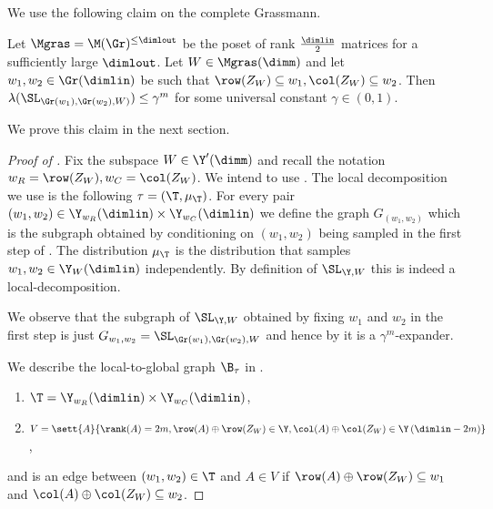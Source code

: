We use the following claim on the complete Grassmann.
\begin{claim} \label{claim:expansion-no-maximal-matrix-graph}
    Let \(\Mgras=\M(\Gr)^{\leq \dimlout}\) be the poset of rank \(\frac{\dimlin}{2}\) matrices for a sufficiently large \(\dimlout\). Let \(W \in \Mgras(\dimm)\) and let \(w_1,w_2 \in \Gr(\dimlin)\) be such that \(\row(Z_W) \subseteq w_1, \col(Z_W) \subseteq w_2\). Then \(\lambda(\SL_{\Gr(w_1),\Gr(w_2),W)}) \leq \gamma^{m}\) for some universal constant \(\gamma \in (0,1)\). 
\end{claim}
We prove this claim in the next section.

\begin{proof}[Proof of ]
    Fix the subspace \(W \in \Y'(\dimm)\) and recall the notation \(w_R = \row(Z_W), w_C = \col(Z_W)\). We intend to use . The local decomposition we use is the following \(\tau = (\T,\mu_\T)\). For every pair \((w_1,w_2) \in \Y_{w_R}(\dimlin) \times \Y_{w_C}(\dimlin)\) we define the graph \(G_{(w_1,w_2)}\) which is the subgraph obtained by conditioning on \((w_1,w_2)\) being sampled in the first step of . The distribution \(\mu_\T\) is the distribution that samples \(w_1,w_2 \in \Y_W(\dimlin)\) independently. By definition of \(\SL_{\Y,W}\) this is indeed a local-decomposition.
    
    We observe that the subgraph of \(\SL_{\Y,W}\) obtained by fixing \(w_1\) and \(w_2\) in the first step is just \(G_{w_1,w_2} = \SL_{\Gr(w_1),\Gr(w_2),W}\) and hence by  it is a \(\gamma^{ m}\)-expander. 
    
    We describe the local-to-global graph \(\B_\tau\) in .
    \begin{enumerate}
        \item \(\T = \Y_{w_R}(\dimlin) \times \Y_{w_C}(\dimlin)\),
        \item \(V = \sett{A}{\rank(A) = 2m, \row(A) \oplus \row(Z_W) \in \Y, \col(A) \oplus \col(Z_W) \in \Y \left ( \dimlin - 2m \right )}\),
    \end{enumerate}
    and is an edge between \((w_1,w_2) \in \T\) and \(A \in V\) if \(\row(A) \oplus \row(Z_W) \subseteq w_1\) and \(\col(A) \oplus \col(Z_W) \subseteq w_2\).
    

\end{proof}
